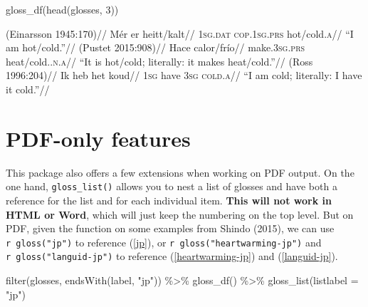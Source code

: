 \documentclass[
]{article}
\newenvironment{Shaded}{\begin{snugshade}}{\end{snugshade}}
\newcommand{\AttributeTok}[1]{\textcolor[rgb]{0.77,0.63,0.00}{#1}}
\newcommand{\DecValTok}[1]{\textcolor[rgb]{0.00,0.00,0.81}{#1}}
\newcommand{\FunctionTok}[1]{\textcolor[rgb]{0.00,0.00,0.00}{#1}}
\newcommand{\NormalTok}[1]{#1}
\newcommand{\SpecialCharTok}[1]{\textcolor[rgb]{0.00,0.00,0.00}{#1}}
\newcommand{\StringTok}[1]{\textcolor[rgb]{0.31,0.60,0.02}{#1}}
\begin{document}
\begin{Shaded}
\begin{Highlighting}[]
\FunctionTok{gloss\_df}\NormalTok{(}\FunctionTok{head}\NormalTok{(glosses, }\DecValTok{3}\NormalTok{))}
\end{Highlighting}
\end{Shaded}

\ex\label{feel-icelandic} \begingl \glpreamble (Einarsson 1945:170)// \gla Mér er heitt/kalt// \glb \textsc{1sg.dat} \textsc{cop.1sg.prs} hot/cold.\textsc{a}// \glft ``I am hot/cold.''//
\endgl \xe 
\ex\label{amb-spanish} \begingl \glpreamble (Pustet 2015:908)// \gla Hace calor/frío// \glb make.\textsc{3sg.prs} heat/cold.\textsc{.n.a}// \glft ``It is hot/cold; literally: it makes heat/cold.''//
\endgl \xe 
\ex\label{feel-dutch} \begingl \glpreamble (Ross 1996:204)// \gla Ik heb het koud// \glb \textsc{1sg} have \textsc{3sg} \textsc{cold.a}// \glft ``I am cold; literally: I have it cold.''//
\endgl \xe 

\hypertarget{pdf-only-features}{%
\section{PDF-only features}\label{pdf-only-features}}

This package also offers a few extensions when working on PDF output. On the one hand, \texttt{gloss\_list()} allows you to nest a list of glosses and have both a reference for the list and for each individual item. \textbf{This will not work in HTML or Word}, which will just keep the numbering on the top level. But on PDF, given the function on some examples from Shindo (2015), we can use \texttt{\textasciigrave{}r\ gloss("jp")\textasciigrave{}} to reference (\ref{jp}), or \texttt{\textasciigrave{}r\ gloss("heartwarming-jp")\textasciigrave{}} and \texttt{\textasciigrave{}r\ gloss("languid-jp")\textasciigrave{}} to reference (\ref{heartwarming-jp}) and (\ref{languid-jp}).

\begin{Shaded}
\begin{Highlighting}[]
\FunctionTok{filter}\NormalTok{(glosses, }\FunctionTok{endsWith}\NormalTok{(label, }\StringTok{"jp"}\NormalTok{)) }\SpecialCharTok{\%\textgreater{}\%} 
  \FunctionTok{gloss\_df}\NormalTok{() }\SpecialCharTok{\%\textgreater{}\%} 
  \FunctionTok{gloss\_list}\NormalTok{(}\AttributeTok{listlabel =} \StringTok{"jp"}\NormalTok{)}
\end{Highlighting}
\end{Shaded}
\end{document}
